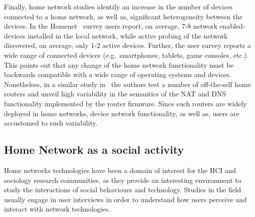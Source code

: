Finally, home network studies identify an increase in the number of devices
connected to a home network, as well as, significant heterogeneity between the
devices.  In the Homenet~\cite{homenetProfiler} survey users report, on average,
7-8 network enabled-devices installed in the local network, while active probing
of the network discovered, on average, only 1-2 active devices. Further, the
user survey reports a wide range of connected devices (e.g.~smartphones,
tablets, game consoles, etc.).  This points out that any change of the home
network functionality must be backwards compatible with a wide range of
operating systems and devices. Nonetheless, in a similar study
in~\cite{Hatonen10} the authors test a number of off-the-self home routers and
unveil high variability in the semantics of the NAT and DNS functionality
implemented by the router firmware. Since such routers are widely deployed in
home networks, device network functionality, as well as, users are accustomed to
such variability.

\subsection{Home Network as a social activity} \label{s:home_social}

Home networks technologies have been a domain of interest for the HCI and
sociology research communities, as they provide an interesting environment to
study the interactions of social behaviours and technology.  Studies in the
field usually engage in user interviews in order to understand how users
perceive and interact with network technologies. 


